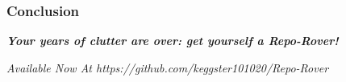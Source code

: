 \documentclass{beamer}
\begin{document}
\begin{frame}
    \centering
    \frametitle{Conclusion}
    \begin{block}{}
    \begin{center}
	\emph{\huge{\textbf{Your years of clutter are over: get yourself a Repo-Rover!}}}
    \end{center}
    \end{block}
	\vspace{3.5cm}
    \begin{block}{}
    \begin{center}
    \emph{\Large{Available Now At \emph{https://github.com/keggster101020/Repo-Rover}}}
    \end{center}
    \end{block}
\end{frame}


\end{document}
